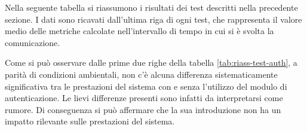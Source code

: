 Nella seguente tabella si riassumono i risultati dei test descritti nella precedente sezione. I dati sono ricavati dall'ultima riga di ogni test, che rappresenta il valore medio delle metriche calcolate nell'intervallo di tempo in cui si è svolta la comunicazione.
\begin{table}[H]
    \caption{Tabella riassuntiva dei risultati dei test sul modulo di autenticazione}
    \label{tab:riass-test-auth}
\end{table}

\noindent Come si può osservare dalle prime due righe della tabella \ref{tab:riass-test-auth}, a parità di condizioni ambientali, non c'è alcuna differenza sistematicamente significativa tra le prestazioni del sistema con e senza l'utilizzo del modulo di autenticazione. Le lievi differenze presenti sono infatti da interpretarsi come rumore. Di conseguenza si può affermare che la sua introduzione non ha un impatto rilevante sulle prestazioni del sistema.

